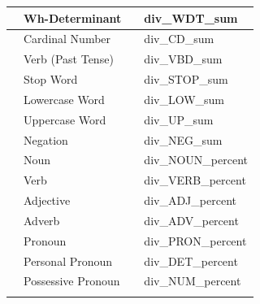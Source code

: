 \documentclass{article}
\begin{document}
\begin{longtable}[c]{| >{\centering\arraybackslash}p{} | >{\centering\arraybackslash}p{} | >{\centering\arraybackslash}p{} | >{\centering\arraybackslash}p{} |}
                                   & Wh-Determinant                       &                           & div\_WDT\_sum               \\ \cline{2-2} \cline{4-4} 
                                   & Cardinal Number                      &                           & div\_CD\_sum                \\ \cline{2-2} \cline{4-4} 
                                   & Verb (Past Tense)                    &                           & div\_VBD\_sum               \\ \cline{2-2} \cline{4-4} 
                                   & Stop Word                            &                           & div\_STOP\_sum              \\ \cline{2-2} \cline{4-4} 
                                   & Lowercase Word                       &                           & div\_LOW\_sum               \\ \cline{2-2} \cline{4-4} 
                                   & Uppercase Word                       &                           & div\_UP\_sum                \\ \cline{2-2} \cline{4-4} 
                                   & Negation                             &                           & div\_NEG\_sum               \\ \cline{2-4} 
                                   & Noun                                 & \multirow{18}{*}{Percent} & div\_NOUN\_percent          \\ \cline{2-2} \cline{4-4} 
                                   & Verb                                 &                           & div\_VERB\_percent          \\ \cline{2-2} \cline{4-4} 
                                   & Adjective                            &                           & div\_ADJ\_percent           \\ \cline{2-2} \cline{4-4} 
                                   & Adverb                               &                           & div\_ADV\_percent           \\ \cline{2-2} \cline{4-4} 
                                   & Pronoun                              &                           & div\_PRON\_percent          \\ \cline{2-2} \cline{4-4} 
                                   & Personal Pronoun                     &                           & div\_DET\_percent           \\ \cline{2-2} \cline{4-4} 
                                   & Possessive Pronoun                   &                           & div\_NUM\_percent           \\ \cline{2-2} \cline{4-4} 

\end{longtable}
\end{document}
